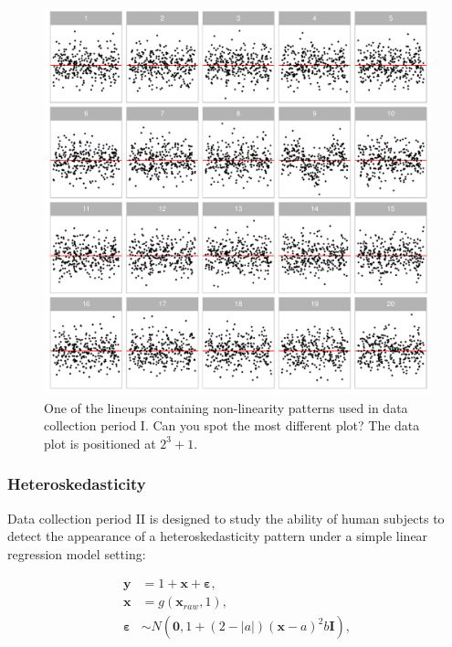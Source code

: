 \documentclass[]{interact}
\theoremstyle{plain}%
\theoremstyle{definition}
\theoremstyle{remark}
\begin{document}
\begin{figure}

{\centering \includegraphics[width=1\linewidth]{paper_comparison_files/figure-latex/example-poly-lineup-1} 

}

\caption{One of the lineups containing non-linearity patterns used in data collection period I. Can you spot the most different plot? The data plot is positioned at $2^3 + 1$.}\label{fig:example-poly-lineup}
\end{figure}

\hypertarget{heteroskedasticity}{%
\subsubsection{Heteroskedasticity}\label{heteroskedasticity}}

Data collection period II is designed to study the ability of human
subjects to detect the appearance of a heteroskedasticity pattern under
a simple linear regression model setting:

\begin{align} \label{eq:heter-model}
\boldsymbol{y} &= 1 + \boldsymbol{x} + \boldsymbol{\varepsilon},\\
\boldsymbol{x} &= g(\boldsymbol{x}_{raw}, 1),\\
\boldsymbol{\varepsilon} &\sim N(\boldsymbol{0}, 1 + (2 - |a|)(\boldsymbol{x} - a)^2b \boldsymbol{I}), 
\end{align}
\end{document}
